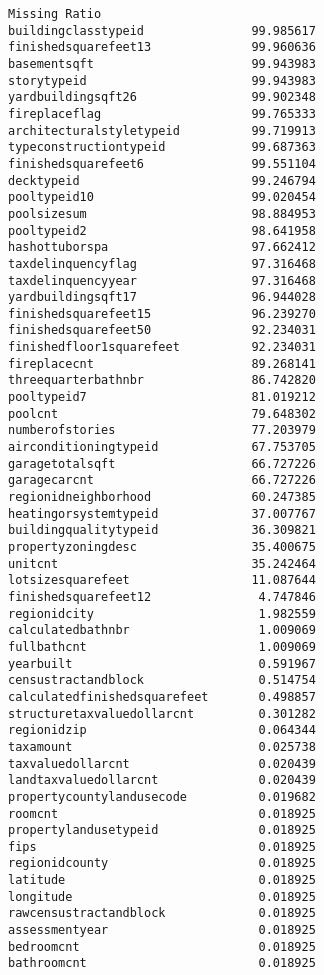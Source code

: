 \documentclass[11pt]{article}
\makeatletter
\newcommand{\boxspacing}{\kern\kvtcb@left@rule\kern\kvtcb@boxsep}
\newcommand{\prompt}[4]{
        {\ttfamily\llap{{\color{#2}[#3]:\hspace{3pt}#4}}\vspace{-\baselineskip}}
    }
\makeatother
\begin{document}
            \begin{tcolorbox}[breakable, size=fbox, boxrule=.5pt, pad at break*=1mm, opacityfill=0]
\prompt{Out}{outcolor}{18}{\boxspacing}
\begin{Verbatim}[commandchars=\\\{\}]
                              Missing Ratio
buildingclasstypeid               99.985617
finishedsquarefeet13              99.960636
basementsqft                      99.943983
storytypeid                       99.943983
yardbuildingsqft26                99.902348
fireplaceflag                     99.765333
architecturalstyletypeid          99.719913
typeconstructiontypeid            99.687363
finishedsquarefeet6               99.551104
decktypeid                        99.246794
pooltypeid10                      99.020454
poolsizesum                       98.884953
pooltypeid2                       98.641958
hashottuborspa                    97.662412
taxdelinquencyflag                97.316468
taxdelinquencyyear                97.316468
yardbuildingsqft17                96.944028
finishedsquarefeet15              96.239270
finishedsquarefeet50              92.234031
finishedfloor1squarefeet          92.234031
fireplacecnt                      89.268141
threequarterbathnbr               86.742820
pooltypeid7                       81.019212
poolcnt                           79.648302
numberofstories                   77.203979
airconditioningtypeid             67.753705
garagetotalsqft                   66.727226
garagecarcnt                      66.727226
regionidneighborhood              60.247385
heatingorsystemtypeid             37.007767
buildingqualitytypeid             36.309821
propertyzoningdesc                35.400675
unitcnt                           35.242464
lotsizesquarefeet                 11.087644
finishedsquarefeet12               4.747846
regionidcity                       1.982559
calculatedbathnbr                  1.009069
fullbathcnt                        1.009069
yearbuilt                          0.591967
censustractandblock                0.514754
calculatedfinishedsquarefeet       0.498857
structuretaxvaluedollarcnt         0.301282
regionidzip                        0.064344
taxamount                          0.025738
taxvaluedollarcnt                  0.020439
landtaxvaluedollarcnt              0.020439
propertycountylandusecode          0.019682
roomcnt                            0.018925
propertylandusetypeid              0.018925
fips                               0.018925
regionidcounty                     0.018925
latitude                           0.018925
longitude                          0.018925
rawcensustractandblock             0.018925
assessmentyear                     0.018925
bedroomcnt                         0.018925
bathroomcnt                        0.018925
\end{Verbatim}
\end{tcolorbox}
        
\end{document}
